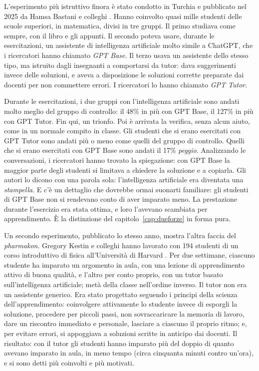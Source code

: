 L'esperimento più istruttivo finora è stato condotto in Turchia e
pubblicato nel 2025 da Hamsa Bastani e colleghi
\parencite{bastani2025}. Hanno coinvolto quasi mille studenti delle
scuole superiori, in matematica, divisi in tre gruppi. Il primo
studiava come sempre, con il libro e gli appunti. Il secondo poteva
usare, durante le esercitazioni, un assistente di intelligenza
artificiale molto simile a ChatGPT, che i ricercatori hanno chiamato
\emph{GPT Base}. Il terzo usava un assistente dello stesso tipo, ma
istruito dagli insegnanti a comportarsi da tutor: dava suggerimenti
invece delle soluzioni, e aveva a disposizione le soluzioni corrette
preparate dai docenti per non commettere errori. I ricercatori lo hanno
chiamato \emph{GPT Tutor}.

Durante le esercitazioni, i due gruppi con l'intelligenza artificiale
sono andati molto meglio del gruppo di controllo: il 48\% in più con
GPT Base, il 127\% in più con GPT Tutor. Fin qui, un trionfo. Poi è
arrivata la verifica, senza alcun aiuto, come in un normale compito in
classe. Gli studenti che si erano esercitati con GPT Tutor sono andati
più o meno come quelli del gruppo di controllo. Quelli che si erano
esercitati con GPT Base sono andati il 17\% \emph{peggio}. Analizzando
le conversazioni, i ricercatori hanno trovato la spiegazione: con GPT
Base la maggior parte degli studenti si limitava a chiedere la
soluzione e a copiarla. Gli autori lo dicono con una parola sola:
l'intelligenza artificiale era diventata una \emph{stampella}. E c'è un
dettaglio che dovrebbe ormai suonarti familiare: gli studenti di GPT
Base non si rendevano conto di aver imparato meno. La prestazione
durante l'esercizio era stata ottima, e loro l'avevano scambiata per
apprendimento. È la distinzione del capitolo~\ref{cap:dueforze} in
forma pura.

Un secondo esperimento, pubblicato lo stesso anno, mostra l'altra
faccia del \emph{pharmakon}. Gregory Kestin e colleghi hanno lavorato
con 194 studenti di un corso introduttivo di fisica all'Università di
Harvard \parencite{kestin2025}. Per due settimane, ciascuno studente ha
imparato un argomento in aula, con una lezione di apprendimento attivo
di buona qualità, e l'altro per conto proprio, con un tutor basato
sull'intelligenza artificiale; metà della classe nell'ordine inverso.
Il tutor non era un assistente generico. Era stato progettato seguendo
i principi della scienza dell'apprendimento: coinvolgere attivamente lo
studente invece di esporgli la soluzione, procedere per piccoli passi,
non sovraccaricare la memoria di lavoro, dare un riscontro immediato
e personale, lasciare a ciascuno il proprio ritmo; e, per evitare
errori, si appoggiava a soluzioni scritte in anticipo dai docenti. Il
risultato: con il tutor gli studenti hanno imparato più del doppio di
quanto avevano imparato in aula, in meno tempo (circa cinquanta minuti
contro un'ora), e si sono detti più coinvolti e più motivati.

